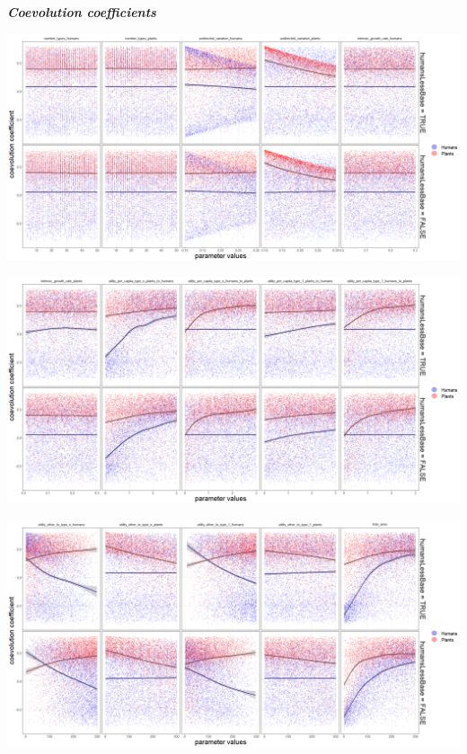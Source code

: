 \documentclass[
]{book}
\begin{document}

\textbf{\emph{Coevolution coefficients}}

\includegraphics[width=1\linewidth]{plots/5_LHS_humansLessBase_coevolution_coefficients_bifurcationPlot_twoVariables_per_parameter_and_scenario_part1}

\includegraphics[width=1\linewidth]{plots/5_LHS_humansLessBase_coevolution_coefficients_bifurcationPlot_twoVariables_per_parameter_and_scenario_part2}

\includegraphics[width=1\linewidth]{plots/5_LHS_humansLessBase_coevolution_coefficients_bifurcationPlot_twoVariables_per_parameter_and_scenario_part3}
\end{document}
